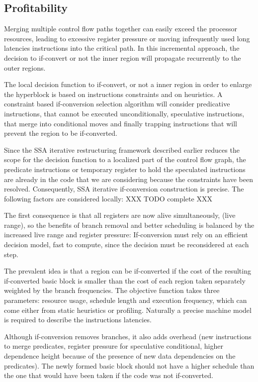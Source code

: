 \subsection{Profitability}

Merging multiple control flow paths together can easily exceed the processor resources, leading to excessive register pressure or moving infrequently used long latencies instructions into the critical path. In this incremental approach, the decision to if-convert or not the inner region will propagate recurrently to the outer regions.

The local decision function to if-convert, or not a inner region in order to enlarge the hyperblock is based on instructions constraints and on heuristics.
A constraint based if-conversion selection algorithm will consider predicative instructions, that cannot be executed unconditionally, speculative instructions, that merge into conditional moves and finally trapping instructions that will prevent the region to be if-converted. 

Since the SSA iterative restructuring framework described earlier reduces the scope for the decision function to a localized part of the control flow graph, the predicate instructions or temporary register to hold the speculated instructions are already in the code that we are considering because the constraints have been resolved. Consequently, SSA iterative if-conversion construction is precise. The following factors are considered locally: XXX TODO complete XXX

The first consequence is that all registers are now alive simultaneously, (live range), so the benefits of branch removal and better scheduling is balanced by the increased live range and register pressure: If-conversion must rely on an efficient decision model, fast to compute, since the decision must be reconsidered at each step.

The prevalent idea is that a region can be if-converted if the cost of the resulting if-converted basic block is smaller than the cost of each region taken separately weighted by the branch frequencies. The objective function takes three parameters: resource usage, schedule length and execution frequency, which can come either from static heuristics or profiling. Naturally a precise machine model is required to describe the instructions latencies.

Although if-conversion removes branches, it also adds overhead (new instructions to merge predicates, register pressure for speculative conditional, higher dependence height because of the presence of new data dependencies on the predicates). The newly formed basic block should not have a higher schedule than the one that would have been taken if the code was not if-converted.

